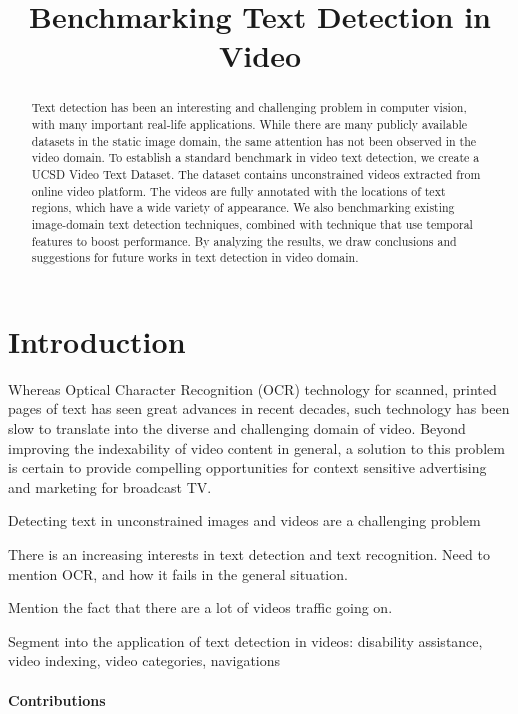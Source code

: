 \documentclass{bmvc2k}
\title{Benchmarking Text Detection in Video}
\begin{document}
\maketitle

\begin{abstract}
Text detection has been an interesting and challenging problem in computer vision, with many important real-life applications. While there are many publicly available datasets in the static image domain, the same attention has not been observed in the video domain. To establish a standard benchmark in video text detection, we create a UCSD Video Text Dataset. The dataset contains unconstrained videos extracted from online video platform. The videos are fully annotated with the locations of text regions, which have a wide variety of appearance. We also benchmarking existing image-domain text detection techniques, combined with technique that use temporal features to boost performance. By analyzing the results, we draw conclusions and suggestions for future works in text detection in video domain.

\end{abstract}

\section{Introduction}
\label{sec:intro}
Whereas Optical Character Recognition (OCR) technology for scanned, printed pages of text has seen great advances in recent decades, such technology has been slow to translate into the diverse and challenging domain of video. Beyond improving the indexability of video content in general, a solution to this problem is certain to provide compelling opportunities for context sensitive advertising and marketing for broadcast TV.

Detecting text in unconstrained images and videos are a challenging problem

There is an increasing interests in text detection and text recognition. Need to mention OCR, and how it fails in the general situation.

Mention the fact that there are a lot of videos traffic going on.

Segment into the application of text detection in videos: disability assistance, video indexing, video categories, navigations

\paragraph{Contributions}
\end{document}
